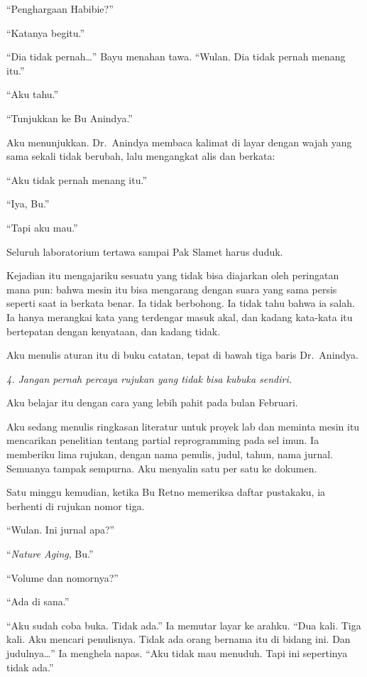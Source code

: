 \documentclass[11pt,twoside,openany]{book}
\makeatletter
\newcommand{\scenebreak}{\par\vspace{0.9em}{\centering\textsc{*\hspace{0.7em}*\hspace{0.7em}*}\par}\vspace{0.9em}\@afterindentfalse\@afterheading}
\makeatother
\begin{document}
``Penghargaan Habibie?''

``Katanya begitu.''

``Dia tidak pernah\ldots{}'' Bayu menahan tawa. ``Wulan. Dia tidak pernah menang itu.''

``Aku tahu.''

``Tunjukkan ke Bu Anindya.''

Aku menunjukkan. Dr.~Anindya membaca kalimat di layar dengan wajah yang sama sekali tidak berubah, lalu mengangkat alis dan berkata:

``Aku tidak pernah menang itu.''

``Iya, Bu.''

``Tapi aku mau.''

Seluruh laboratorium tertawa sampai Pak Slamet harus duduk.

Kejadian itu mengajariku sesuatu yang tidak bisa diajarkan oleh peringatan mana pun: bahwa mesin itu bisa mengarang dengan suara yang sama persis seperti saat ia berkata benar. Ia tidak berbohong. Ia tidak tahu bahwa ia salah. Ia hanya merangkai kata yang terdengar masuk akal, dan kadang kata-kata itu bertepatan dengan kenyataan, dan kadang tidak.

Aku menulis aturan itu di buku catatan, tepat di bawah tiga baris Dr.~Anindya.

\emph{4. Jangan pernah percaya rujukan yang tidak bisa kubuka sendiri.}

\scenebreak
Aku belajar itu dengan cara yang lebih pahit pada bulan Februari.

Aku sedang menulis ringkasan literatur untuk proyek lab dan meminta mesin itu mencarikan penelitian tentang partial reprogramming pada sel imun. Ia memberiku lima rujukan, dengan nama penulis, judul, tahun, nama jurnal. Semuanya tampak sempurna. Aku menyalin satu per satu ke dokumen.

Satu minggu kemudian, ketika Bu Retno memeriksa daftar pustakaku, ia berhenti di rujukan nomor tiga.

``Wulan. Ini jurnal apa?''

``\emph{Nature Aging}, Bu.''

``Volume dan nomornya?''

``Ada di sana.''

``Aku sudah coba buka. Tidak ada.'' Ia memutar layar ke arahku. ``Dua kali. Tiga kali. Aku mencari penulisnya. Tidak ada orang bernama itu di bidang ini. Dan judulnya\ldots{}'' Ia menghela napas. ``Aku tidak mau menuduh. Tapi ini sepertinya tidak ada.''
\end{document}
